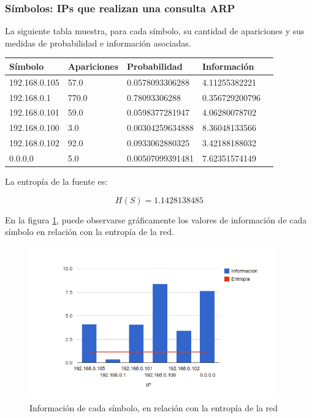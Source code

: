 \documentclass{article}
\begin{document}
\subsubsection{Símbolos: IPs que realizan una consulta ARP}
La siguiente tabla muestra, para cada símbolo, su cantidad de apariciones y
sus medidas de probabilidad e información asociadas.

\vskip10pt

\begin{tabular}{|l|l|l|l|l|}
  \hline
  Símbolo & Apariciones & Probabilidad & Información \\
  \hline
  192.168.0.105 & 57.0 & 0.0578093306288 & 4.11255382221\\
\hline
192.168.0.1 & 770.0 & 0.78093306288 & 0.356729200796\\
\hline
192.168.0.101 & 59.0 & 0.0598377281947 & 4.06280078702\\
\hline
192.168.0.100 & 3.0 & 0.00304259634888 & 8.36048133566\\
\hline
192.168.0.102 & 92.0 & 0.0933062880325 & 3.42188188032\\
\hline
0.0.0.0 & 5.0 & 0.00507099391481 & 7.62351574149\\
\hline

\end{tabular}

\vskip10pt

La entropía de la fuente es:

$$H(S) = 1.1428138485$$

En la figura \ref{fig:red2requesters:infoentro}, puede observarse gráficamente
los valores de información de cada símbolo en relación con la entropía de la
red.

\begin{figure}[h!]
    \centering                                                       
    \includegraphics[width=300pt]{red2/consultas2.png}
    \caption{Información de cada símbolo, en relación con la
        entropía de la red}
    \label{fig:red2requesters:infoentro}
\end{figure}
\end{document}

